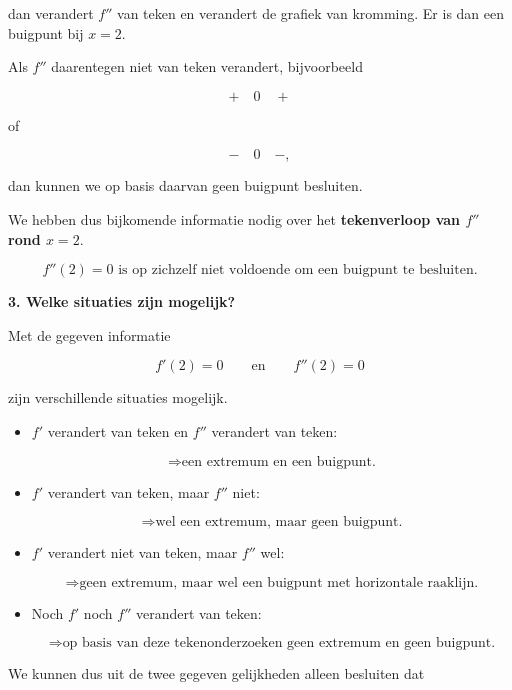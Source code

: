 \documentclass{ximera}
\begin{document}
\begin{oefening}{\oefG}
\begin{oplossing}
    dan verandert $f''$ van teken en verandert de grafiek van kromming.
    Er is dan een buigpunt bij $x=2$.
    
    Als $f''$ daarentegen niet van teken verandert, bijvoorbeeld
    
    \[
    +\quad 0\quad +
    \]
    
    of
    
    \[
    -\quad 0\quad -,
    \]
    
    dan kunnen we op basis daarvan geen buigpunt besluiten.
    
    We hebben dus bijkomende informatie nodig over het
    \textbf{tekenverloop van $f''$ rond $x=2$}.
    
    \[
    \boxed{
    f''(2)=0
    \text{ is op zichzelf niet voldoende om een buigpunt te besluiten.}
    }
    \]
    
    \textbf{3. Welke situaties zijn mogelijk?}
    
    Met de gegeven informatie
    
    \[
    f'(2)=0
    \qquad\text{en}\qquad
    f''(2)=0
    \]
    
    zijn verschillende situaties mogelijk.
    
    \begin{itemize}
    
    \item $f'$ verandert van teken en $f''$ verandert van teken:
    
    \[
    \Rightarrow
    \text{een extremum en een buigpunt.}
    \]
    
    \item $f'$ verandert van teken, maar $f''$ niet:
    
    \[
    \Rightarrow
    \text{wel een extremum, maar geen buigpunt.}
    \]
    
    \item $f'$ verandert niet van teken, maar $f''$ wel:
    
    \[
    \Rightarrow
    \text{geen extremum, maar wel een buigpunt met horizontale raaklijn.}
    \]
    
    \item Noch $f'$ noch $f''$ verandert van teken:
    
    \[
    \Rightarrow
    \text{op basis van deze tekenonderzoeken geen extremum en geen buigpunt.}
    \]
    
    \end{itemize}
    
    We kunnen dus uit de twee gegeven gelijkheden alleen besluiten dat
    

\end{oplossing}
\end{oefening}
\end{document}
